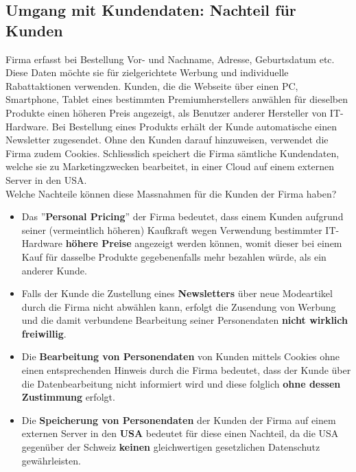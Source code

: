 \subsection{Umgang mit Kundendaten: Nachteil für Kunden}
Firma erfasst bei Bestellung Vor- und Nachname, Adresse, Geburtsdatum etc. Diese Daten möchte sie für zielgerichtete Werbung und individuelle Rabattaktionen verwenden. Kunden, die die Webseite über einen PC, Smartphone, Tablet eines bestimmten Premiumherstellers anwählen für dieselben Produkte einen höheren Preis angezeigt, als Benutzer anderer Hersteller von IT-Hardware. Bei Bestellung eines Produkts erhält der Kunde automatische einen Newsletter zugesendet. Ohne den Kunden darauf hinzuweisen, verwendet die Firma zudem Cookies. Schliesslich speichert die Firma sämtliche Kundendaten, welche sie zu Marketingzwecken bearbeitet, in einer Cloud auf einem externen Server in den USA.\\
Welche Nachteile können diese Massnahmen für die Kunden der Firma haben?
\begin{itemize}
	\item Das ''\textbf{Personal Pricing}'' der Firma bedeutet, dass einem Kunden aufgrund seiner (vermeintlich höheren) Kaufkraft wegen Verwendung bestimmter IT-Hardware \textbf{höhere Preise} angezeigt werden können, womit dieser bei einem Kauf für dasselbe Produkte gegebenenfalls
	mehr bezahlen würde, als ein anderer Kunde.
	\item Falls der Kunde die Zustellung eines \textbf{Newsletters} über neue Modeartikel durch die Firma nicht abwählen kann, erfolgt die Zusendung von Werbung und die damit verbundene Bearbeitung seiner Personendaten \textbf{nicht wirklich freiwillig}.
	\item Die \textbf{Bearbeitung von Personendaten} von Kunden mittels Cookies ohne einen entsprechenden Hinweis durch die Firma bedeutet, dass der Kunde über die Datenbearbeitung nicht informiert wird und diese folglich \textbf{ohne dessen Zustimmung} erfolgt.
	\item Die \textbf{Speicherung von Personendaten} der Kunden der Firma auf einem externen Server in den \textbf{USA} bedeutet für diese einen Nachteil, da die USA gegenüber der Schweiz \textbf{keinen} gleichwertigen gesetzlichen Datenschutz gewährleisten.
\end{itemize}

